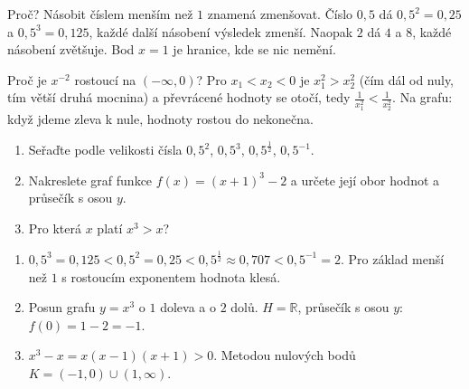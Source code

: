 \begin{center}
\end{center}

Proč? Násobit číslem menším než $1$ znamená zmenšovat. Číslo $0{,}5$ dá $0{,}5^2 = 0{,}25$ a $0{,}5^3 = 0{,}125$, každé další násobení výsledek zmenší. Naopak $2$ dá $4$ a $8$, každé násobení zvětšuje. Bod $x = 1$ je hranice, kde se nic nemění.

\begin{note}
  Proč je $x^{-2}$ rostoucí na $(-\infty, 0)$? Pro $x_1 < x_2 < 0$ je $x_1^2 > x_2^2$ (čím dál od nuly, tím větší druhá mocnina) a převrácené hodnoty se otočí, tedy $\frac{1}{x_1^2} < \frac{1}{x_2^2}$. Na grafu: když jdeme zleva k nule, hodnoty rostou do nekonečna.
\end{note}

\begin{problem}
  \begin{enumerate}[label=(\alph*)]
    \item Seřaďte podle velikosti čísla $0{,}5^2$, $0{,}5^3$, $0{,}5^{\frac{1}{2}}$, $0{,}5^{-1}$.
    \item Nakreslete graf funkce $f(x) = {(x + 1)}^3 - 2$ a určete její obor hodnot a průsečík s osou $y$.
    \item Pro která $x$ platí $x^3 > x$?
  \end{enumerate}
\end{problem}

\begin{solution}
  \begin{enumerate}[label=(\alph*)]
    \item $0{,}5^3 = 0{,}125 < 0{,}5^2 = 0{,}25 < 0{,}5^{\frac{1}{2}}\approx 0{,}707 < 0{,}5^{-1} = 2$. Pro základ menší než $1$ s rostoucím exponentem hodnota klesá.
    \item Posun grafu $y = x^3$ o $1$ doleva a o $2$ dolů. $H = \mathbb{R}$, průsečík s osou $y$: $f(0) = 1 - 2 = -1$.
    \item $x^3 - x = x(x - 1)(x + 1) > 0$. Metodou nulových bodů $K = (-1, 0)\cup(1, \infty)$.
  \end{enumerate}
\end{solution}

